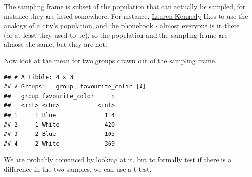 \documentclass[
]{book}
\newenvironment{Shaded}{\begin{snugshade}}{\end{snugshade}}
\newcommand{\DecValTok}[1]{\textcolor[rgb]{0.00,0.00,0.81}{#1}}
\newcommand{\KeywordTok}[1]{\textcolor[rgb]{0.13,0.29,0.53}{\textbf{#1}}}
\newcommand{\NormalTok}[1]{#1}
\newcommand{\OperatorTok}[1]{\textcolor[rgb]{0.81,0.36,0.00}{\textbf{#1}}}
\newcommand{\StringTok}[1]{\textcolor[rgb]{0.31,0.60,0.02}{#1}}
\begin{document}
The sampling frame is subset of the population that can actually be sampled, for instance they are listed somewhere. For instance, \href{https://jazzystats.com/}{Lauren Kennedy} likes to use the analogy of a city's population, and the phonebook - almost everyone is in there (or at least they used to be), so the population and the sampling frame are almost the same, but they are not.

Now look at the mean for two groups drawn out of the sampling frame.

\begin{Shaded}
\end{Shaded}

\begin{verbatim}
## # A tibble: 4 x 3
## # Groups:   group, favourite_color [4]
##   group favourite_color     n
##   <int> <chr>           <int>
## 1     1 Blue              114
## 2     1 White             420
## 3     2 Blue              105
## 4     2 White             369
\end{verbatim}

We are probably convinced by looking at it, but to formally test if there is a difference in the two samples, we can use a t-test.
\end{document}
